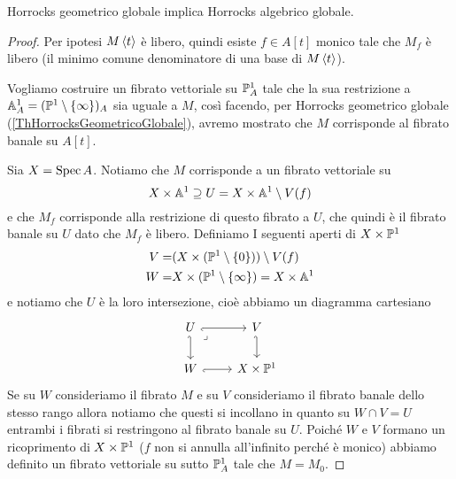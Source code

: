 \begin{proposition}[]\label{PrHGGimplicaHAG} Horrocks geometrico globale implica Horrocks algebrico globale.
\end{proposition}
\begin{proof}
Per ipotesi $M\left\langle {t}\right\rangle$ \`e libero, quindi esiste $f\in A[t]$ monico tale che $M_f$ \`e libero (il minimo comune denominatore di una base di $M\left\langle {t}\right\rangle$).

Vogliamo costruire un fibrato vettoriale su $\mathbb{P}^1_A$ tale che la sua restrizione a $\mathbb{A}^1_A=(\mathbb{P}^1\setminus\left\{{\infty}\right\})_A$ sia uguale a $M$, cos\`i facendo, per Horrocks geometrico globale (\ref{ThHorrocksGeometricoGlobale}), avremo mostrato che $M$ corrisponde al fibrato banale su $A[t]$.

Sia $X=\operatorname{Spec} A$. Notiamo che $M$ corrisponde a un fibrato vettoriale su 
\[X\times \mathbb{A}^1\supseteq U=X\times \mathbb{A}^1\setminus V(f)\]
e che $M_f$ corrisponde alla restrizione di questo fibrato a $U$, che quindi \`e il fibrato banale su $U$ dato che $M_f$ \`e libero.
Definiamo I seguenti aperti di $X\times \mathbb{P}^1$
\begin{align*}
	V=&(X\times (\mathbb{P}^1\setminus\{0\}))\setminus V(f)\\
	W=&X\times(\mathbb{P}^1\setminus\left\{{\infty}\right\})=X\times \mathbb{A}^1
\end{align*}
e notiamo che $U$ \`e la loro intersezione, cio\`e abbiamo un diagramma cartesiano
\[\begin{tikzcd}
	U & V \\
	W & {X\times \Pj^1}
	\arrow[hook', from=1-1, to=1-2]
	\arrow[hook', from=1-1, to=2-1]
	\arrow["\lrcorner"{anchor=center, pos=0.125}, draw=none, from=1-1, to=2-2]
	\arrow[hook', from=1-2, to=2-2]
	\arrow[hook', from=2-1, to=2-2]
\end{tikzcd}\]
Se su $W$ consideriamo il fibrato $M$ e su $V$ consideriamo il fibrato banale dello stesso rango allora notiamo che questi si incollano in quanto su $W\cap V=U$ entrambi i fibrati si restringono al fibrato banale su $U$. Poich\'e $W$ e $V$ formano un ricoprimento di $X\times \mathbb{P}^1$ ($f$ non si annulla all'infinito perch\'e \`e monico) abbiamo definito un fibrato vettoriale su sutto $\mathbb{P}^1_A$ tale che $M=M_0$.


\end{proof}
